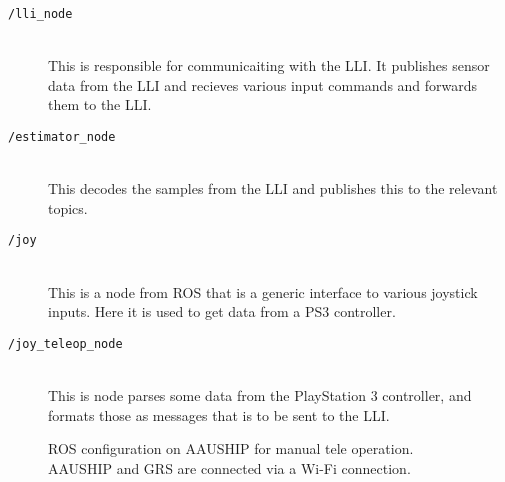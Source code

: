 \begin{description}
	\item[\texttt{/lli\_node}]\hfill \\
		This is responsible for communicaiting with the \ac{LLI}. It
		publishes sensor data from the \ac{LLI} and recieves various input
		commands and forwards them to the \ac{LLI}.
	\item[\texttt{/estimator\_node}]\hfill \\
		This decodes the samples from the \ac{LLI} and publishes this to
		the relevant topics.
	\item[\texttt{/joy}]\hfill \\
		This is a node from \ac{ROS} that is a generic interface to
		various joystick inputs. Here it is used to get data from a PS3
		controller.
	\item[\texttt{/joy\_teleop\_node}]\hfill \\
		This is node parses some data from the PlayStation 3 controller, and formats
		those as messages that is to be sent to the \ac{LLI}.
\end{description}
\begin{figure}[htbp]
	\centering
	
	\caption{ROS configuration on AAUSHIP for manual tele operation.
	AAUSHIP and GRS are connected via a Wi-Fi connection.}
	\label{fig:ros-aauship-teleop}
\end{figure}


